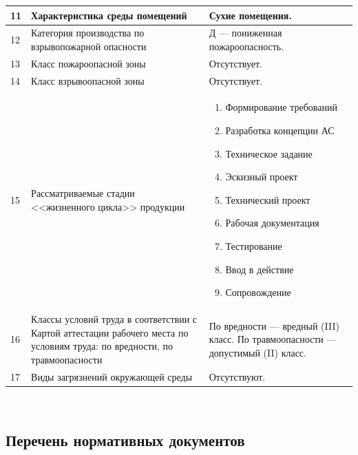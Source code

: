 \begin{footnotesize}
\begin{longtable}[h]{|p{}|p{}|p{}|}
	\hline
		11 & 
		Характеристика среды помещений &
		Сухие помещения. \\
	\hline
		12 & 
		Категория производства по взрывопожарной опасности &
		Д --- пониженная пожароопасность. \\
	\hline
		13 & 
		Класс пожароопасной зоны &
		Отсутствует. \\
	\hline
		14 & 
		Класс взрывоопасной зоны &
		Отсутствует. \\
	\hline
		15 & 
		Рассматриваемые стадии <<жизненного цикла>> продукции &
		\begin{enumerate}
			\item Формирование требований
			\item Разработка концепции АС 
			\item Техническое задание 
			\item Эскизный проект
			\item Технический проект
			\item Рабочая документация
			\item Тестирование
			\item Ввод в действие
			\item Сопровождение
		\end{enumerate} \\
	\hline
		16 & 
		Классы условий труда в соответствии с Картой аттестации рабочего места по условиям труда: \newline
		по вредности, \newline
		по травмоопасности &
		По вредности --- вредный (III) класс. \newline
		По травмоопасности --- допустимый (II) класс. \\
	\hline
		17 & 
		Виды загрязнений окружающей среды &
		Отсутствуют. \\
	\hline
\end{longtable}
\end{footnotesize}

~

\subsection{Перечень нормативных документов}

